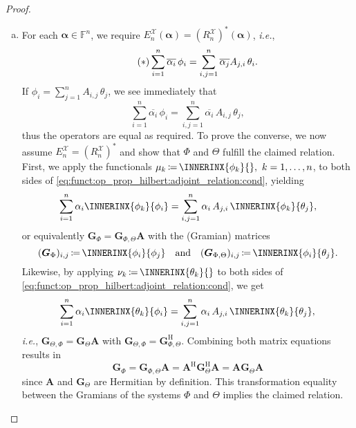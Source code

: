 \documentclass[a4paper]{paper}
\newcommand*{\SPC}[1]{{\ensuremath{\mathscr{#1}}}}
\newcommand{\FIELD}{{\ensuremath{\mathbb{F}}}}
\newcommand*{\Fn}{{\ensuremath{\FIELD^n}}}
\newcommand*{\EXT}[2]{\ensuremath{E_{#1}^{#2}}}
\newcommand*{\REST}[2]{\ensuremath{R_{#1}^{#2}}}
\newcommand*{\RnX}{{\ensuremath{\REST{n}{\SPC{X}}}}}
\newcommand*{\EnX}{{\ensuremath{\EXT{n}{\SPC{X}}}}}
\DeclareMathOperator{\DEFEQ}{{\coloneqq}}
\newcommand*{\HERM}[1]{{\ensuremath{#1^{\mathrm{H}}}}}
\newcommand{\ie}{\textsl{i.e.}\xspace}
\newcommand{\valpha}{\boldsymbol{\alpha}}
\newcommand{\vA}{\boldsymbol{A}}
\newcommand{\vG}{\boldsymbol{G}}
\begin{document}
\begin{proof}
\begin{enumerate}[(a)]
  \item For each $\valpha \in \Fn$, we require $\EnX(\valpha) = (\RnX)^*(\valpha)$, \ie,
  \begin{equation}
   \label{eq:funct:op_prop_hilbert:adjoint_relation:cond}
   \tag{{$\ast$}}
   \sum_{i=1}^n \overline{\alpha_i}\, \phi_i = \sum_{i,j=1}^n \overline{\alpha_j} A_{j,i}\, \theta_i.
  \end{equation}
  If $\phi_i = \sum_{j=1}^n A_{i,j}\, \theta_j$, we see immediately that
  \begin{equation*}
   \sum_{i=1}^n \overline{\alpha_i}\, \phi_i = \sum_{i,j=1}^n \overline{\alpha_i}\, A_{i,j}\, \theta_j,
  \end{equation*}
  thus the operators are equal as required. To prove the converse, we now assume $\EnX = (\RnX)^*$ and show that 
  $\Phi$ and $\Theta$ fulfill the claimed relation. First, we apply the functionals 
  $\mu_k \DEFEQ  \INNERINX{\phi_k}{},\ k=1,\dots,n$, to both sides of 
  \eqref{eq:funct:op_prop_hilbert:adjoint_relation:cond}, yielding
  \begin{equation*}
   \sum_{i=1}^n \alpha_i \INNERINX{\phi_k}{\phi_i} = \sum_{i,j=1}^n \alpha_i\, A_{j,i}\, \INNERINX{\phi_k}{\theta_j},
  \end{equation*}
  or equivalently $\vG_{\Phi} = \vG_{\Phi,\Theta} \vA$ with the (Gramian) matrices
  \begin{equation*}
   (\vG_{\Phi})_{i,j} \DEFEQ  \INNERINX{\phi_i}{\phi_j}
   \quad \text{and} \quad
   (\vG_{\Phi, \Theta})_{i,j} \DEFEQ  \INNERINX{\phi_i}{\theta_j}.
  \end{equation*}
  Likewise, by applying $\nu_k \DEFEQ  \INNERINX{\theta_k}{}$ to both sides of 
  \eqref{eq:funct:op_prop_hilbert:adjoint_relation:cond}, we get
  \begin{equation*}
   \sum_{i=1}^n \alpha_i \INNERINX{\theta_k}{\phi_i} = \sum_{i,j=1}^n \alpha_i\, A_{j,i}\, 
   \INNERINX{\theta_k}{\theta_j},
  \end{equation*}
  \ie, $\vG_{\Theta,\Phi} = \vG_\Theta \vA$ with $\vG_{\Theta,\Phi} = \HERM{\vG_{\Phi,\Theta}}$. Combining both matrix 
  equations results in
  \begin{equation*}
   \vG_{\Phi} = \vG_{\Phi,\Theta} \vA = \HERM{\vA} \HERM{\vG_\Theta} \vA = \vA \vG_\Theta \vA
  \end{equation*}
  since $\vA$ and $\vG_\Theta$ are Hermitian by definition. This transformation equality between the Gramians of the 
  systems $\Phi$ and $\Theta$ implies the claimed relation.
  

\end{enumerate}
\end{proof}
\end{document}
